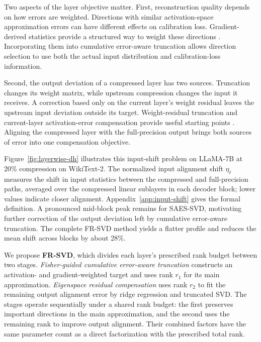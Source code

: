\documentclass[11pt]{article}
\begin{document}
Two aspects of the layer objective matter. First, reconstruction quality depends on how errors are weighted. Directions with similar activation-space approximation errors can have different effects on calibration loss. Gradient-derived statistics provide a structured way to weight these directions \citep{hsu2022fwsvd,chekalina2025gfwsvd}. Incorporating them into cumulative error-aware truncation allows direction selection to use both the actual input distribution and calibration-loss information.

Second, the output deviation of a compressed layer has two sources. Truncation changes its weight matrix, while upstream compression changes the input it receives. A correction based only on the current layer's weight residual leaves the upstream input deviation outside its target. Weight-residual truncation and current-layer activation-error compensation provide useful starting points \citep{bai2025ercsvd,liu2025eora}. Aligning the compressed layer with the full-precision output brings both sources of error into one compensation objective.

Figure~\ref{fig:layerwise-dh} illustrates this input-shift problem on LLaMA-7B at 20\% compression on WikiText-2. The normalized input alignment shift $\eta_\ell$ measures the shift in input statistics between the compressed and full-precision paths, averaged over the compressed linear sublayers in each decoder block; lower values indicate closer alignment. Appendix~\ref{app:input-shift} gives the formal definition. A pronounced mid-block peak remains for SAES-SVD, motivating further correction of the output deviation left by cumulative error-aware truncation. The complete FR-SVD method yields a flatter profile and reduces the mean shift across blocks by about 28\%.



We propose \textbf{FR-SVD}, which divides each layer's prescribed rank budget between two stages. \emph{Fisher-guided cumulative error-aware truncation} constructs an activation- and gradient-weighted target and uses rank $r_1$ for its main approximation. \emph{Eigenspace residual compensation} uses rank $r_2$ to fit the remaining output alignment error by ridge regression and truncated SVD. The stages operate sequentially under a shared rank budget: the first preserves important directions in the main approximation, and the second uses the remaining rank to improve output alignment. Their combined factors have the same parameter count as a direct factorization with the prescribed total rank.
\end{document}
